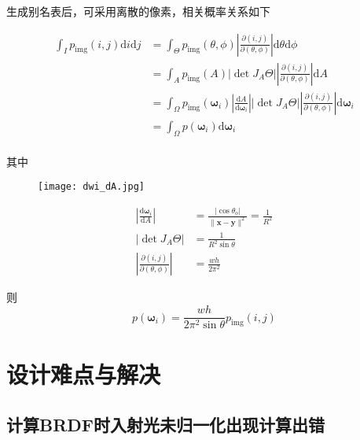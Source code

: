 \documentclass[14pt]{scrartcl} %
\begin{document}
生成别名表后，可采用离散的像素，相关概率关系如下

\begin{equation}
\begin{aligned}
\int_{I}p_{\text{img}}(i,j)\mathrm{d}i\mathrm{d}j
&=\int_{\Theta}p_{\text{img}}(\theta,\phi)\left|\frac{\partial(i,j)}{\partial(\theta,\phi)}\right|\mathrm{d}\theta\mathrm{d}\phi\\
&=\int_{A}p_{\text{img}}(A)\left|\det J_A\Theta\right|\left|\frac{\partial(i,j)}{\partial(\theta,\phi)}\right|\mathrm{d}A\\
&=\int_{\Omega}p_{\text{img}}(\pmb{\omega}_i)\left|\frac{\mathrm{d}A}{\mathrm{d}\pmb{\omega}_i}\right|\left|\det J_A{\Theta}\right|\left|\frac{\partial(i,j)}{\partial(\theta,\phi)}\right|\mathrm{d}\pmb{\omega}_i\\
&=\int_{\Omega}p(\pmb{\omega}_i)\mathrm{d}\pmb{\omega}_i\\
\end{aligned}
\end{equation}

其中
\begin{figure}[h] %
	\centering
	\texttt{[image: dwi\_dA.jpg]} %
\end{figure}

\begin{equation}
\begin{aligned}
\left|\frac{\mathrm{d}\pmb{\omega}_i}{\mathrm{d}A}\right|&=\frac{|\cos\theta_o|}{\|\pmb{x}-\pmb{y}\|^2}=\frac{1}{R^2}\\
\left|\det J_A\Theta\right|&=\frac{1}{R^2\sin\theta}\\
\left|\frac{\partial(i,j)}{\partial(\theta,\phi)}\right|&=\frac{wh}{2\pi^2}
\end{aligned}
\end{equation}

则
\begin{equation}
p(\pmb{\omega}_i)=\frac{wh}{2\pi^2\sin\theta}p_{\text{img}}(i,j)
\end{equation}


\pagebreak
\section{设计难点与解决}

\subsection{计算BRDF时入射光未归一化出现计算出错}
\end{document}
